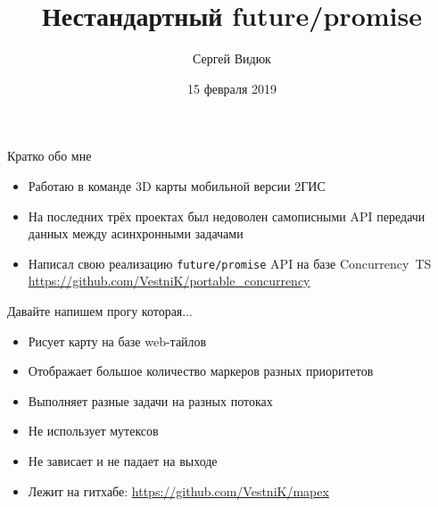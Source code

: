 \documentclass[aspectratio=169,pdf,hyperref={unicode},14pt]{beamer}
\title{Нестандартный future/promise}
\author{Сергей Видюк}
\date{15 февраля 2019}
\begin{document}
\begin{frame}
 \maketitle
\end{frame}

\begin{frame}[t]{Кратко обо мне}
 \begin{itemize}[<+->]
  \item Работаю в команде 3D карты мобильной версии 2ГИС
  \item На последних трёх проектах был недоволен самописными API передачи данных между асинхронными задачами
  \item Написал свою реализацию \texttt{future/promise} API на базе Concurrency~TS \url{https://github.com/VestniK/portable_concurrency}
 \end{itemize}
\end{frame}

\begin{frame}[t]{Давайте напишем прогу которая...}
 \begin{itemize}[<+->]
  \item Рисует карту на базе web-тайлов
  \item Отображает большое количество маркеров разных приоритетов
  \item Выполняет разные задачи на разных потоках
  \item Не использует мутексов
  \item Не зависает и не падает на выходе
  \item Лежит на гитхабе: \url{https://github.com/VestniK/mapex}
 \end{itemize}
\end{frame}
\end{document}
